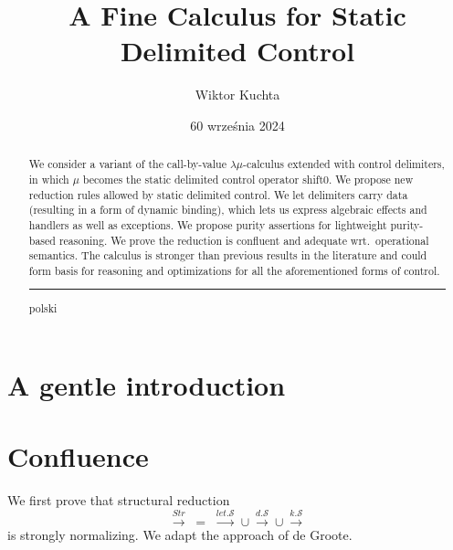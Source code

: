 \documentclass[a4paper, 11pt,titlepage, openright, twoside]{report}
\title{\textbf{A Fine Calculus for Static Delimited Control}}
\author{Wiktor Kuchta}
\date{60 września 2024} %
\renewcommand{\S}{\mathcal{S}}
\newcommand{\+}{\enspace}
\begin{document}
\maketitle


\thispagestyle{empty}
\cleardoublepage
\begin{abstract}
	We consider a variant of the call-by-value $λμ$-calculus extended with control delimiters,
	in which $μ$ becomes the static delimited control operator shift0.
	We propose new reduction rules allowed by static delimited control.
	We let delimiters carry data (resulting in a form of dynamic binding), which lets us express algebraic effects and handlers as well as exceptions.
	We propose purity assertions for lightweight purity-based reasoning.
	We prove the reduction is confluent and adequate wrt.\ operational semantics.
	The calculus is stronger than previous results in the literature and could form basis for
	reasoning and optimizations for all the aforementioned forms of control.
	\begin{center} \rule[3pt]{300pt}{1pt} \end{center}
	polski
\end{abstract}


\thispagestyle{empty}
\cleardoublepage
\setcounter{page}{5}
\tableofcontents


\chapter{A gentle introduction}

\chapter{Confluence}

We first prove that structural reduction
$$\xrightarrow{Str} \;=\; \xrightarrow{let.\S} ∪ \xrightarrow{d.\S} ∪ \xrightarrow{k.\S}$$
is strongly normalizing. We adapt the approach of de Groote\cite{Groote}.
\end{document}
